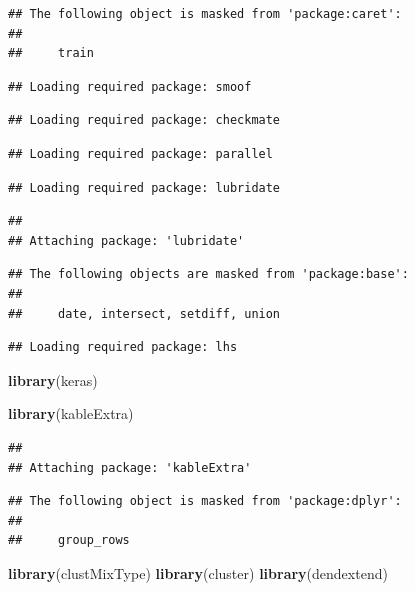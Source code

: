 \documentclass[
]{article}
\newenvironment{Shaded}{\begin{snugshade}}{\end{snugshade}}
\newcommand{\KeywordTok}[1]{\textcolor[rgb]{0.13,0.29,0.53}{\textbf{#1}}}
\newcommand{\NormalTok}[1]{#1}
\begin{document}
\begin{verbatim}
## The following object is masked from 'package:caret':
## 
##     train
\end{verbatim}

\begin{verbatim}
## Loading required package: smoof
\end{verbatim}

\begin{verbatim}
## Loading required package: checkmate
\end{verbatim}

\begin{verbatim}
## Loading required package: parallel
\end{verbatim}

\begin{verbatim}
## Loading required package: lubridate
\end{verbatim}

\begin{verbatim}
## 
## Attaching package: 'lubridate'
\end{verbatim}

\begin{verbatim}
## The following objects are masked from 'package:base':
## 
##     date, intersect, setdiff, union
\end{verbatim}

\begin{verbatim}
## Loading required package: lhs
\end{verbatim}

\begin{Shaded}
\begin{Highlighting}[]
\KeywordTok{library}\NormalTok{(keras)}

\KeywordTok{library}\NormalTok{(kableExtra)}
\end{Highlighting}
\end{Shaded}

\begin{verbatim}
## 
## Attaching package: 'kableExtra'
\end{verbatim}

\begin{verbatim}
## The following object is masked from 'package:dplyr':
## 
##     group_rows
\end{verbatim}

\begin{Shaded}
\begin{Highlighting}[]
\KeywordTok{library}\NormalTok{(clustMixType)}
\KeywordTok{library}\NormalTok{(cluster)}
\KeywordTok{library}\NormalTok{(dendextend) }
\end{Highlighting}
\end{Shaded}
\end{document}
